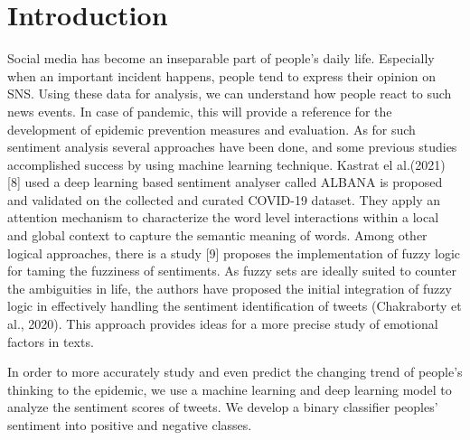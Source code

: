 \section{Introduction}
Social media has become an inseparable part of people’s daily life. Especially
when an important incident happens, people tend to express their opinion on
SNS. Using these data for analysis, we can understand how people react to
such news events. In case of pandemic, this will provide a reference for the
development of epidemic prevention measures and evaluation. As for such
sentiment analysis several approaches have been done, and some previous
studies accomplished success by using machine learning technique. Kastrat el
al.(2021) [8] used a deep learning based sentiment analyser called ALBANA is
proposed and validated on the collected and curated COVID-19 dataset. They
apply an attention mechanism to characterize the word level interactions
within a local and global context to capture the semantic meaning of words.
Among other logical approaches, there is a study [9] proposes the
implementation of fuzzy logic for taming the fuzziness of sentiments. As
fuzzy sets are ideally suited to counter the ambiguities in life, the authors
have proposed the initial integration of fuzzy logic in effectively handling
the sentiment identification of tweets (Chakraborty et al., 2020). This
approach provides ideas for a more precise study of emotional factors in
texts.

In order to more accurately study and even predict the changing trend of
people’s thinking to the epidemic, we use a machine learning and deep
learning model to analyze the sentiment scores of tweets. We develop a binary
classifier peoples' sentiment into positive and negative classes. 

